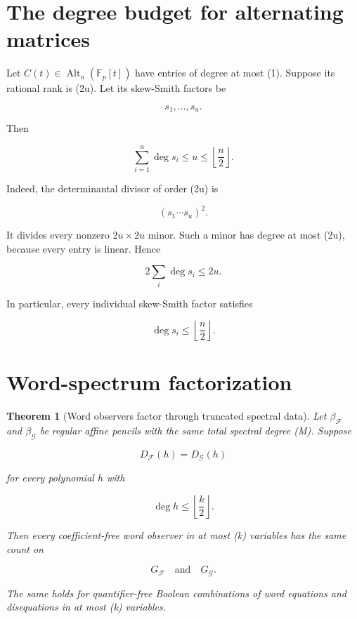 \documentclass[11pt]{article}
\newtheorem{theorem}{Theorem}[section]
\begin{document}
\section{The degree budget for alternating matrices}

Let $C(t)\in\operatorname{Alt}_n(\mathbb F_p[t])$ have entries of degree at most (1). Suppose its rational rank is (2u). Let its skew-Smith factors be

\[
s_1,\ldots,s_u.
\]

Then

\[
\boxed{
\sum_{i=1}^u\deg s_i\le u\le \left\lfloor\frac n2\right\rfloor.
}
\tag{11.1}
\]

Indeed, the determinantal divisor of order (2u) is

\[
(s_1\cdots s_u)^2.
\]

It divides every nonzero $2u\times2u$ minor. Such a minor has degree at most (2u), because every entry is linear. Hence

\[
2\sum_i\deg s_i\le 2u.
\]

In particular, every individual skew-Smith factor satisfies

\[
\deg s_i\le \left\lfloor\frac n2\right\rfloor.
\tag{11.2}
\]

\section{Word-spectrum factorization}

\begin{theorem}[Word observers factor through truncated spectral data]
Let $\beta_{\mathcal F}$ and $\beta_{\mathcal G}$ be regular affine pencils with the same total spectral degree (M). Suppose

\[
D_{\mathcal F}(h)=D_{\mathcal G}(h)
\]

for every polynomial $h$ with

\[
\deg h\le \left\lfloor\frac k2\right\rfloor.
\]

Then every coefficient-free word observer in at most (k) variables has the same count on

\[
G_{\mathcal F}
\quad\text{and}\quad
G_{\mathcal G}.
\]

The same holds for quantifier-free Boolean combinations of word equations and disequations in at most (k) variables.

\end{theorem}
\end{document}
